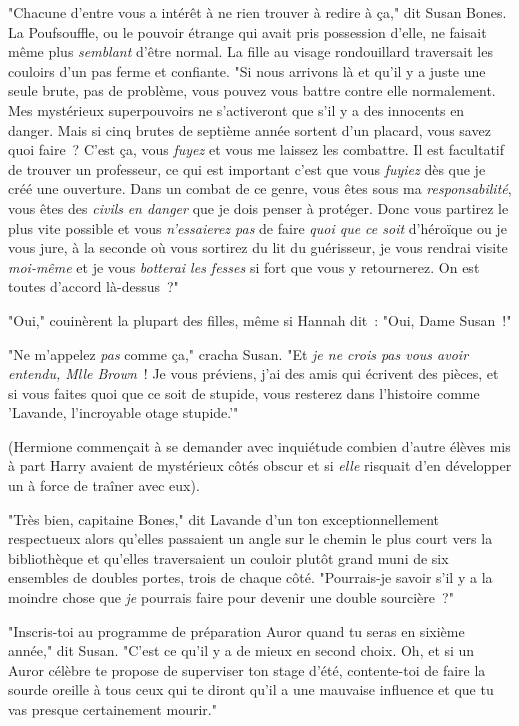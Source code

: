 "Chacune d'entre vous a intérêt à ne rien trouver à redire à ça," dit Susan Bones. La Poufsouffle, ou le pouvoir étrange qui avait pris possession d'elle, ne faisait même plus \emph{semblant} d'être normal. La fille au visage rondouillard traversait les couloirs d'un pas ferme et confiante. "Si nous arrivons là et qu'il y a juste une seule brute, pas de problème, vous pouvez vous battre contre elle normalement. Mes mystérieux superpouvoirs ne s'activeront que s'il y a des innocents en danger. Mais si cinq brutes de septième année sortent d'un placard, vous savez quoi faire~? C'est ça, vous \emph{fuyez} et vous me laissez les combattre. Il est facultatif de trouver un professeur, ce qui est important c'est que vous \emph{fuyiez} dès que je créé une ouverture. Dans un combat de ce genre, vous êtes sous ma \emph{responsabilité}, vous êtes des \emph{civils} \emph{en danger} que je dois penser à protéger. Donc vous partirez le plus vite possible et vous \emph{n'essaierez pas} de faire \emph{quoi que ce soit} d'héroïque ou je vous jure, à la seconde où vous sortirez du lit du guérisseur, je vous rendrai visite \emph{moi-même} et je vous \emph{botterai les fesses} si fort que vous y retournerez. On est toutes d'accord là-dessus~?"

"Oui," couinèrent la plupart des filles, même si Hannah dit~: "Oui, Dame Susan~!"

"Ne m'appelez \emph{pas} comme ça," cracha Susan. "Et \emph{je ne crois pas vous avoir entendu, Mlle Brown}~! Je vous préviens, j'ai des amis qui écrivent des pièces, et si vous faites quoi que ce soit de stupide, vous resterez dans l'histoire comme 'Lavande, l'incroyable otage stupide.'"

(Hermione commençait à se demander avec inquiétude combien d'autre élèves mis à part Harry avaient de mystérieux côtés obscur et si \emph{elle} risquait d'en développer un à force de traîner avec eux).

"Très bien, capitaine Bones," dit Lavande d'un ton exceptionnellement respectueux alors qu'elles passaient un angle sur le chemin le plus court vers la bibliothèque et qu'elles traversaient un couloir plutôt grand muni de six ensembles de doubles portes, trois de chaque côté. "Pourrais-je savoir s'il y a la moindre chose que \emph{je} pourrais faire pour devenir une double sourcière~?"

"Inscris-toi au programme de préparation Auror quand tu seras en sixième année," dit Susan. "C'est ce qu'il y a de mieux en second choix. Oh, et si un Auror célèbre te propose de superviser ton stage d'été, contente-toi de faire la sourde oreille à tous ceux qui te diront qu'il a une mauvaise influence et que tu vas presque certainement mourir."


